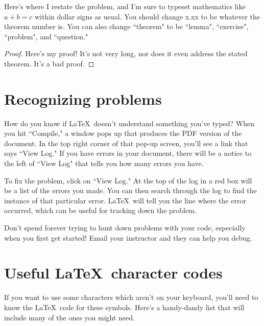 \documentclass[12pt]{article}
\newenvironment{theorem}[2][Theorem]{\begin{trivlist}
\item[\hskip \labelsep {\bfseries #1}\hskip \labelsep {\bfseries #2.}]}{\end{trivlist}}
\begin{document}
\begin{theorem}{x.xx}
Here's where I restate the problem, and I'm sure to typeset mathematics like $a+b=c$ within dollar signs as usual.  You should change x.xx to be whatever the theorem number is.  You can also change ``theorem" to be ``lemma", ``exercise", ``problem", and ``question."
\end{theorem}

\begin{proof}
Here's my proof!  It's not very long, nor does it even address the stated theorem.  It's a bad proof.
\end{proof}

\section{Recognizing problems}

How do you know if \LaTeX\ doesn't understand something you've typed?  When you hit ``Compile," a window pops up that produces the PDF version of the document.  In the top right corner of that pop-up screen, you'll see a link that says ``View Log."  If you have errors in your document, there will be a notice to the left of ``View Log" that tells you how many errors you have.

To fix the problem, click on ``View Log."  At the top of the log in a red box will be a list of the errors you made.  You can then search through the log to find the instance of that particular error.  \LaTeX\ will tell you the line where the error occurred, which can be useful for tracking down the problem.

Don't spend forever trying to hunt down problems with your code, especially when you first get started!  Email your instructor and they can help you debug.

\section{Useful \LaTeX\ character codes}

If you want to use some characters which aren't on your keyboard, you'll need to know the \LaTeX\ code for these symbols.  Here's a handy-dandy list that will include many of the ones you might need.
\end{document}
